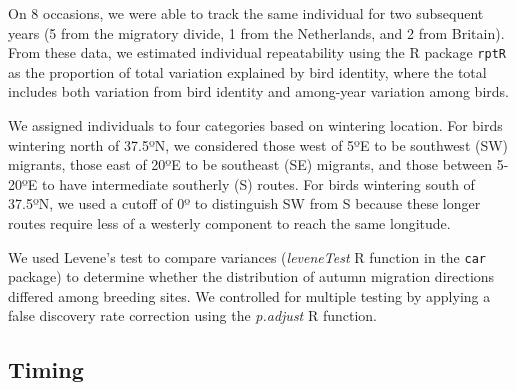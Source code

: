 \documentclass[a4paper, twoside]{templates/ociamthesis}
\begin{document}
On 8 occasions, we were able to track the same individual for two subsequent years (5 from the migratory divide, 1 from the Netherlands, and 2 from Britain). From these data, we estimated individual repeatability using the R package \texttt{rptR} \autocite{stoffelRptRRepeatabilityEstimation2017} as the proportion of total variation explained by bird identity, where the total includes both variation from bird identity and among-year variation among birds.

We assigned individuals to four categories based on wintering location. For birds wintering north of 37.5ºN, we considered those west of 5ºE to be southwest (SW) migrants, those east of 20ºE to be southeast (SE) migrants, and those between 5-20ºE to have intermediate southerly (S) routes. For birds wintering south of 37.5ºN, we used a cutoff of 0º to distinguish SW from S because these longer routes require less of a westerly component to reach the same longitude.

We used Levene's test to compare variances (\emph{leveneTest} R function in the \texttt{car} package) to determine whether the distribution of autumn migration directions differed among breeding sites. We controlled for multiple testing by applying a false discovery rate correction using the \emph{p.adjust} R function.

\hypertarget{timing}{%
\subsection{Timing}\label{timing}}
\end{document}
